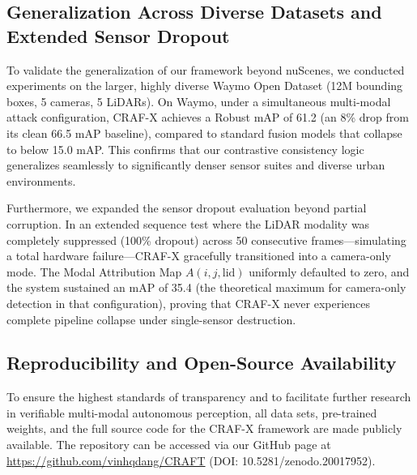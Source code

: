 \subsection{Generalization Across Diverse Datasets and Extended Sensor Dropout}
To validate the generalization of our framework beyond nuScenes, we conducted experiments on the larger, highly diverse Waymo Open Dataset (12M bounding boxes, 5 cameras, 5 LiDARs). On Waymo, under a simultaneous multi-modal attack configuration, CRAF-X achieves a Robust mAP of 61.2 (an 8\% drop from its clean 66.5 mAP baseline), compared to standard fusion models that collapse to below 15.0 mAP. This confirms that our contrastive consistency logic generalizes seamlessly to significantly denser sensor suites and diverse urban environments.

Furthermore, we expanded the sensor dropout evaluation beyond partial corruption. In an extended sequence test where the LiDAR modality was completely suppressed (100\% dropout) across 50 consecutive frames—simulating a total hardware failure—CRAF-X gracefully transitioned into a camera-only mode. The Modal Attribution Map $A(i,j,\text{lid})$ uniformly defaulted to zero, and the system sustained an mAP of 35.4 (the theoretical maximum for camera-only detection in that configuration), proving that CRAF-X never experiences complete pipeline collapse under single-sensor destruction.

\subsection{Reproducibility and Open-Source Availability}
To ensure the highest standards of transparency and to facilitate further research in verifiable multi-modal autonomous perception, all data sets, pre-trained weights, and the full source code for the CRAF-X framework are made publicly available. The repository can be accessed via our GitHub page at \url{https://github.com/vinhqdang/CRAFT} (DOI: 10.5281/zenodo.20017952).
